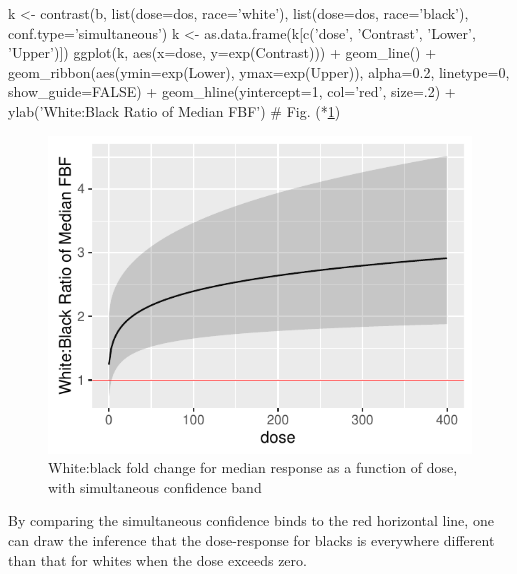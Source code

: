 \begin{Schunk}
\begin{Sinput}
k <- contrast(b, list(dose=dos, race='white'),
                 list(dose=dos, race='black'), conf.type='simultaneous')
k <- as.data.frame(k[c('dose', 'Contrast', 'Lower', 'Upper')])
ggplot(k, aes(x=dose, y=exp(Contrast))) + geom_line() +
  geom_ribbon(aes(ymin=exp(Lower), ymax=exp(Upper)), alpha=0.2, linetype=0,
              show_guide=FALSE) +
  geom_hline(yintercept=1, col='red', size=.2) +
  ylab('White:Black Ratio of Median FBF')    # Fig. (*\ref{fig:serial-glse}\ipacue*)
\end{Sinput}
\begin{figure}[htbp]

\centerline{\includegraphics{serial-glse-1} }

\caption[White]{White:black fold change for median response as a function of dose, with simultaneous confidence band}\label{fig:serial-glse}
\end{figure}
\end{Schunk}
By comparing the simultaneous confidence binds to the red horizontal
line, one can draw the inference that the dose-response for blacks is
everywhere different than that for whites when the dose exceeds zero.
\def\apacue{0}
